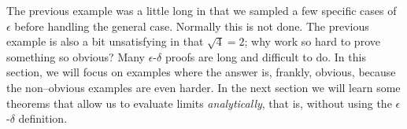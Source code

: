 The previous example was a little long in that we sampled a few specific cases of $\epsilon$ before handling the general case. Normally this is not done.  The previous example is also a bit unsatisfying in that $\sqrt{4}=2$; why work so hard to prove something so obvious? Many $\epsilon$-$\delta$ proofs are long and difficult to do. In this section, we will focus on examples where the answer is, frankly, obvious, because the non--obvious examples are even harder. In the next section we will learn some theorems that allow us to evaluate limits \textit{analytically}, that is, without using the $\epsilon$-$\delta$ definition.\\

